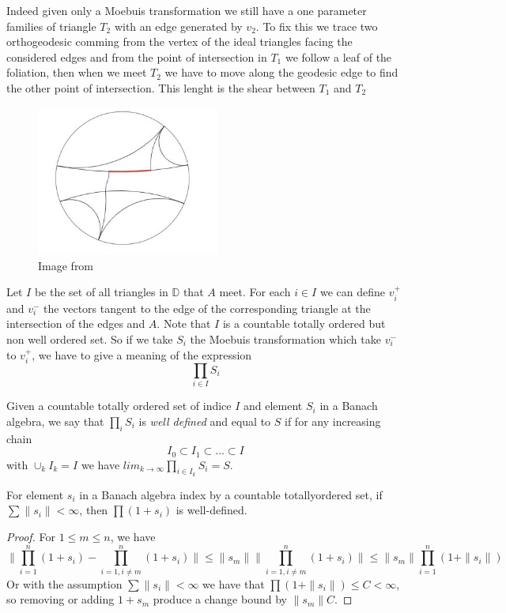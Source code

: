 Indeed given only a Moebuis transformation we still have a one parameter families of triangle $T_2$ with an edge generated by $v_2$. To fix this we trace two orthogeodesic comming from the vertex of the ideal triangles facing the considered edges and from the point of intersection in $T_1$ we follow a leaf of the foliation, then when we meet $T_2$ we have to move along the geodesic edge to find the other point of intersection. This lenght is the shear between $T_1$ and $T_2$

\begin{figure}[h!]
\centering
\includegraphics[width=6cm]{Image/Shear.jpg}
\caption{Image from \cite{wright2018mirzakhani}}
\end{figure}

Let $I$ be the set of all triangles in $\mathbb{D}$ that $A$ meet. For each $i\in I$ we can define $v_i^+$ and $v_i^-$ the vectors tangent to the edge of the corresponding triangle at the intersection of the edges and $A$. Note that $I$ is a countable totally ordered but non well ordered set. So if we take $S_i$ the Moebuis transformation which take $v_i^-$ to $v_i^+$, we have to give a meaning of the expression \[
\prod_{i\in I}S_i
\]

\begin{dfnt}
Given a countable totally ordered set of indice $I$ and element $S_i$ in a Banach algebra, we say that $\prod_i S_i$ is \emph{well defined} and equal to $S$ if for any increasing chain \[
I_0 \subset I_1 \subset ... \subset I
\]
with $\cup_k I_k=I$ we have $lim_{k \to \infty} \prod_{i \in I_k}S_i =S $.
\end{dfnt}

\begin{lem}
For element $s_i$ in a Banach algebra index by a countable totallyordered set, if $\sum \| s_i \| < \infty$, then $\prod(1+s_i)$ is well-defined.
\end{lem}
\begin{proof}
For $1 \leq m \leq n$, we have \[
\| \prod_{i=1}^n(1+s_i)-\prod_{i=1,i \neq m}^n (1+s_i) \| \leq \|s_m \| \| \prod_{i=1,i \neq m}^n (1+s_i) \| \leq \|s_m\| \prod_{i=1}^n (1+\|s_i\|)
\]
Or with the assumption $\sum \| s_i \| < \infty$ we have that $\prod(1+\|s_i\|) \leq C < \infty$, so removing or adding $1+s_m$ produce a change bound by $\|s_m\| C$.
\end{proof}


